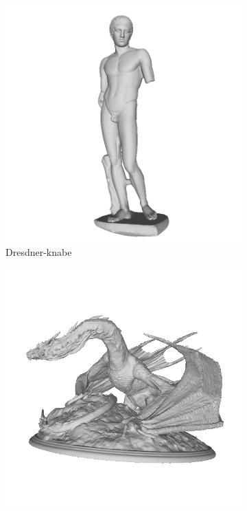 \begin{figure}
	\centering
	\begin{subfigure}[b]{0.23\linewidth}
		\includegraphics[width=\linewidth]{./Figures/train-dataset/16.dresdner-knabe.png}
		\caption{Dresdner-knabe}
	\end{subfigure}
	\begin{subfigure}[b]{0.23\linewidth}
		\includegraphics[width=\linewidth]{./Figures/train-dataset/17.fantasy-dragon.png}

\end{subfigure}
\end{figure}
